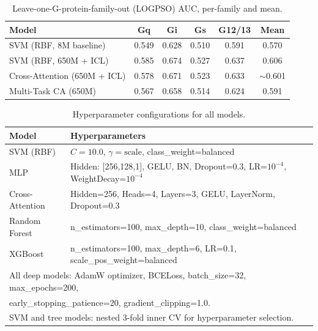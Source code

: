 \documentclass[11pt,a4paper]{article}
\begin{document}
\begin{table}[h!]
\centering
\caption{Leave-one-G-protein-family-out (LOGPSO) AUC, per-family and mean.}
\label{tab:logpso}
\begin{tabular}{lccccc}
\toprule
Model & Gq & Gi & Gs & G12/13 & Mean \\
\midrule
SVM (RBF, 8M baseline)  & 0.549 & 0.628 & 0.510 & 0.591 & 0.570 \\
SVM (RBF, 650M + ICL)   & 0.585 & 0.674 & 0.527 & 0.637 & 0.606 \\
Cross-Attention (650M + ICL) & 0.578 & 0.671 & 0.523 & 0.633 & $\sim$0.601 \\
Multi-Task CA (650M)     & 0.567 & 0.658 & 0.514 & 0.624 & 0.591 \\
\bottomrule
\end{tabular}
\end{table}

\begin{table}[h!]
\centering
\caption{Hyperparameter configurations for all models.}
\label{tab:hyperparams}
\begin{tabular}{ll}
\toprule
Model & Hyperparameters \\
\midrule
SVM (RBF) & $C=10.0$, $\gamma=\text{scale}$, class\_weight=balanced \\
MLP & Hidden: [256,128,1], GELU, BN, Dropout=0.3, LR=$10^{-4}$, WeightDecay=$10^{-4}$ \\
Cross-Attention & Hidden=256, Heads=4, Layers=3, GELU, LayerNorm, Dropout=0.3 \\
Random Forest & n\_estimators=100, max\_depth=10, class\_weight=balanced \\
XGBoost & n\_estimators=100, max\_depth=6, LR=0.1, scale\_pos\_weight=balanced \\
\midrule
\multicolumn{2}{l}{\small All deep models: AdamW optimizer, BCELoss, batch\_size=32, max\_epochs=200,}\\
\multicolumn{2}{l}{\small early\_stopping\_patience=20, gradient\_clipping=1.0.}\\
\multicolumn{2}{l}{\small SVM and tree models: nested 3-fold inner CV for hyperparameter selection.}\\
\end{tabular}
\end{table}
\end{document}
